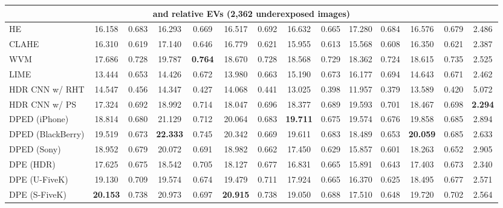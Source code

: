 \documentclass[final]{cvpr}
\begin{document}
\begin{table*}
\begin{center}
{\begin{tabular}{|l|c|c|c|c|c|c|c|c|c|c|c|c|c|}
\multicolumn{14}{|c|}{\cellcolor[HTML]{CCECEB} and  relative EVs (2,362 underexposed images)}\\ \hline
HE \cite{10.5555/559707} & 16.158 & 0.683 & 16.293 & 0.669 & 16.517  & 0.692 & 16.632 &  0.665 & 17.280 & 0.684 & 16.576 & 0.679 & 2.486\\
CLAHE \cite{adaptivehisteq} & 16.310 & 0.619 & 17.140 & 0.646 & 16.779 & 0.621 & 15.955 & 0.613 & 15.568  & 0.608 & 16.350 & 0.621 & 2.387\\
WVM \cite{fu2016weighted} & 17.686 & 0.728 & 19.787 & \cellcolor[HTML]{79CC7A}\textbf{0.764} & 18.670 & 0.728 & 18.568 & \cellcolor[HTML]{FFFBA3}0.729 & 18.362 & \cellcolor[HTML]{FFCCCB}0.724 & 18.615 & 0.735 & 2.525\\
\cellcolor[HTML]{D5D5D5}LIME \cite{guo2016lime, guo2017lime} & 13.444 & 0.653 & 14.426 & 0.672 & 13.980 & 0.663 & 15.190 & 0.673 & 16.177 & 0.694 & 14.643 & 0.671 & 2.462\\
HDR CNN \cite{HDRCNN} w/ RHT \cite{yang2018image}& 14.547 & 0.456 & 14.347 & 0.427 & 14.068 & 0.441 & 13.025 & 0.398 &  11.957 & 0.379 & 13.589 & 0.420 & 5.072\\
HDR CNN \cite{HDRCNN} w/ PS \cite{dayley2010photoshop}& 17.324 & 0.692 & 18.992 & 0.714 & 18.047 & 0.696 & 18.377 & 0.689 & \cellcolor[HTML]{FFFBA3}19.593 & 0.701 & 18.467 & 0.698 & \cellcolor[HTML]{79CC7A}\textbf{2.294}\\
DPED (iPhone) \cite{DPED}& 18.814 & 0.680 & \cellcolor[HTML]{FFFBA3}21.129 & 0.712 & 20.064 & 0.683 &  \cellcolor[HTML]{79CC7A}\textbf{19.711}  & 0.675 & \cellcolor[HTML]{FFCCCB}19.574  & 0.676 & \cellcolor[HTML]{FFFBA3}19.858 & 0.685 & 2.894\\
DPED (BlackBerry) \cite{DPED} & \cellcolor[HTML]{FFFBA3}19.519 & 0.673 & \cellcolor[HTML]{79CC7A}\textbf{22.333} & 0.745 & 20.342 & 0.669 & 19.611 & 0.683 & 18.489 & 0.653 & \cellcolor[HTML]{79CC7A}\textbf{20.059} & 0.685 & 2.633\\
DPED (Sony) \cite{DPED}& 18.952 & 0.679 & 20.072 & 0.691 & 18.982 &  0.662 & 17.450 & 0.629 & 15.857 & 0.601 & 18.263 & 0.652 & 2.905\\
DPE (HDR) \cite{DPE} & 17.625 & 0.675 & 18.542 & 0.705 & 18.127  & 0.677 & 16.831 & 0.665 & 15.891 & 0.643 & 17.403 & 0.673 & \cellcolor[HTML]{FFFBA3}2.340\\
DPE (U-FiveK) \cite{DPE} & 19.130 & 0.709 & 19.574 & 0.674 & 19.479 & 0.711 & 17.924 & 0.665 & 16.370 & 0.625 & 18.495 & 0.677 & 2.571\\
DPE (S-FiveK) \cite{DPE} & \cellcolor[HTML]{79CC7A}\textbf{20.153} & \cellcolor[HTML]{FFCCCB}0.738 & \cellcolor[HTML]{FFCCCB}20.973 & 0.697 & \cellcolor[HTML]{79CC7A}\textbf{20.915} & 0.738 & \cellcolor[HTML]{FFCCCB}19.050 & 0.688 & 17.510 & 0.648 & \cellcolor[HTML]{FFCCCB}19.720 & 0.702  & 2.564\\

\end{tabular}}
\end{center}
\end{table*}
\end{document}
